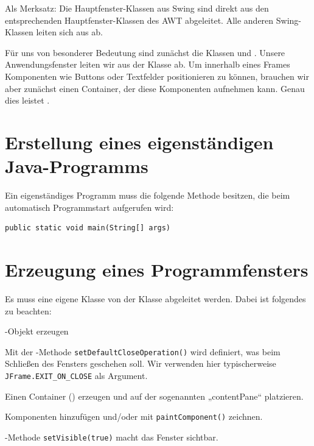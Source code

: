 Als Merksatz: Die Hauptfenster-Klassen aus Swing sind direkt aus den
entsprechenden Hauptfenster-Klassen des AWT abgeleitet. Alle anderen
Swing-Klassen leiten sich aus  ab.

Für uns von besonderer Bedeutung sind zunächst die Klassen  und
. Unsere Anwendungsfenster leiten wir aus der Klasse
 ab. Um innerhalb eines Frames Komponenten wie Buttons oder
Textfelder positionieren zu können, brauchen wir aber zunächst einen Container,
der diese Komponenten aufnehmen kann. Genau dies leistet .


\section{Erstellung eines eigenständigen Java-Programms}

Ein eigenständiges Programm muss die folgende Methode besitzen, die beim
automatisch Programmstart aufgerufen wird:

\begin{lstlisting}
public static void main(String[] args)
\end{lstlisting}


\section{Erzeugung eines Programmfensters}

Es muss eine eigene Klasse von der Klasse  abgeleitet werden.
Dabei ist folgendes zu beachten:

\begin{compactenum}[1.]
\item {}-Objekt erzeugen

\item Mit der -Methode \lstinline|setDefaultCloseOperation()|
wird definiert, was beim Schließen des Fensters geschehen soll. Wir verwenden
hier typischerweise \lstinline|JFrame.EXIT_ON_CLOSE| als Argument.

\item Einen Container () erzeugen und auf der sogenannten
„contentPane“ platzieren.

\item Komponenten hinzufügen und/oder mit \lstinline|paintComponent()| zeichnen.

\item {}-Methode \lstinline|setVisible(true)| macht das Fenster
sichtbar.
\end{compactenum}


